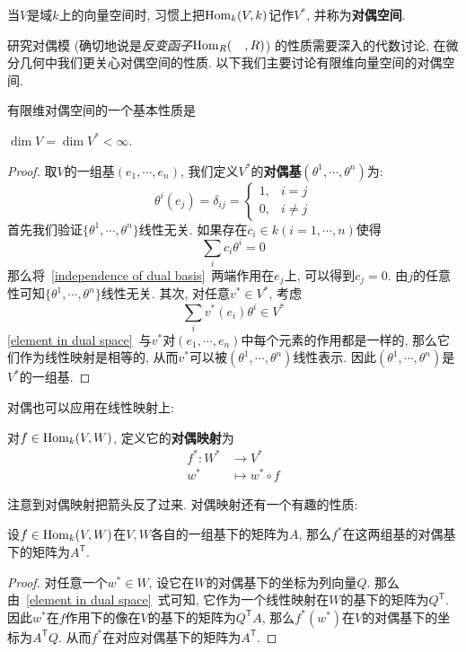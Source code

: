 \begin{sym}
    当$V$是域$k$上的向量空间时, 习惯上把$\operatorname*{Hom}_k(V,k)$记作$V^*$, 并称为\textbf{对偶空间}.
\end{sym}

研究对偶模 (确切地说是\textit{反变函子}$\operatorname*{Hom}_R(\quad,R)$) 的性质需要深入的代数讨论, 在微分几何中我们更关心对偶空间的性质.
以下我们主要讨论有限维向量空间的对偶空间.

有限维对偶空间的一个基本性质是
\begin{prop}\label{dim of dual space}
    $\dim V=\dim V^*<\infty$.
\end{prop}
\begin{proof}
    取$V$的一组基$(e_1,\cdots,e_n)$, 我们定义$V^*$的\textbf{对偶基}$(\theta^1,\cdots,\theta^n)$为:
    \[\theta^i(e_j)=\delta_{ij}=\begin{cases}
        1, & i=j\\
        0, & i\neq j
    \end{cases}\]
    首先我们验证$\{\theta^1,\cdots,\theta^n\}$线性无关.
    如果存在$c_i\in k(i=1,\cdots,n)$使得
    \begin{equation}
        \sum_ic_i\theta^i=0\label{independence of dual basis}
    \end{equation}
    那么将~\eqref{independence of dual basis}~两端作用在$e_j$上, 可以得到$c_j=0$.
    由$j$的任意性可知$\{\theta^1,\cdots,\theta^n\}$线性无关.
    其次, 对任意$v^*\in V^*$, 考虑
    \begin{equation}
        \sum_{i}v^*(e_i)\theta^i\in V^*\label{element in dual space}
    \end{equation}
    \eqref{element in dual space}~与$v^*$对$(e_1,\cdots,e_n)$中每个元素的作用都是一样的, 那么它们作为线性映射是相等的,
    从而$v^*$可以被$(\theta^1,\cdots,\theta^n)$线性表示.
    因此$(\theta^1,\cdots,\theta^n)$是$V^*$的一组基.
\end{proof}

对偶也可以应用在线性映射上:
\begin{defn}
    对$f\in\operatorname*{Hom}_k(V,W)$, 定义它的\textbf{对偶映射}为
    \begin{align*}
        f^*:W^*&\to V^*\\
        w^*&\mapsto w^*\circ f
    \end{align*}
\end{defn}
注意到对偶映射把箭头反了过来.
对偶映射还有一个有趣的性质:
\begin{prop}
    设$f\in\operatorname*{Hom}_k(V,W)$在$V,W$各自的一组基下的矩阵为$A$, 那么$f^*$在这两组基的对偶基下的矩阵为$A^\mathsf{T}$.
\end{prop}
\begin{proof}
    对任意一个$w^*\in W$, 设它在$W$的对偶基下的坐标为列向量$Q$.
    那么由~\eqref{element in dual space}~式可知, 它作为一个线性映射在$W$的基下的矩阵为$Q^\mathsf{T}$.
    因此$w^*$在$f$作用下的像在$V$的基下的矩阵为$Q^\mathsf{T}A$, 那么$f^*(w^*)$在$V$的对偶基下的坐标为$A^\mathsf{T}Q$.
    从而$f^*$在对应对偶基下的矩阵为$A^\mathsf{T}$.
\end{proof}

